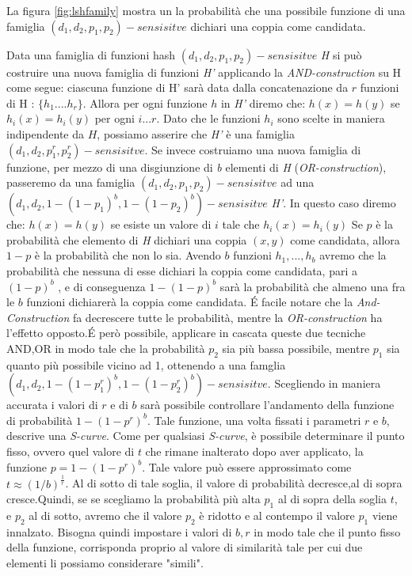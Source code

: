 \documentclass[a4paper,12pt]{report}
\begin{document}
La figura \ref{fig:lshfamily} mostra un la probabilità che una possibile funzione di una famiglia  $(d_1,d_2,p_1,p_2)-sensisitve$ dichiari una coppia come candidata.

Data una famiglia di funzioni hash $(d_1,d_2,p_1,p_2)-sensisitve$ \emph{H} si può costruire una nuova famiglia di funzioni \emph{H'} applicando la \emph{AND-construction} su H come segue: ciascuna funzione di H' sarà data dalla concatenazione  da $r$ funzioni di H : $\lbrace h_1....h_r \rbrace $. Allora per ogni funzione $h$ in \emph{H'} diremo che: $h(x)=h(y)$ se $h_i(x)=h_i(y)$ per ogni $i...r$.  Dato che le funzioni $h_i$ sono scelte in maniera indipendente da $H$, possiamo asserire che \emph{H'} è una famiglia $(d_1,d_2,p_1^r,p_2^r)-sensisitve$.
Se invece costruiamo una nuova famiglia di funzione, per mezzo di una disgiunzione di \emph{b} elementi  di \emph{H} (\emph{OR-construction}), passeremo da una famiglia  $(d_1,d_2,p_1,p_2)-sensisitve$ ad una  $(d_1,d_2,1-(1-p_1)^b,1-(1-p_2)^b)-sensisitve$ \emph{H'}. In questo caso diremo che: $h(x)=h(y)$ se esiste  un valore di $i$ tale che $h_i(x)=h_i(y)$ 
Se $p$ è la probabilità che elemento di \emph{H} dichiari una coppia $(x,y)$ come candidata, allora $1-p$ è la probabilità che non lo sia. Avendo $b$ funzioni $h_1,...,h_b$ avremo che la probabilità che nessuna di esse dichiari la coppia come candidata, pari a   $(1-p)^b$ , e di conseguenza $1-(1-p)^b$ sarà la probabilità che almeno una fra le $b$ funzioni dichiarerà la coppia come candidata.
\'E facile notare che la \emph{And-Construction} fa decrescere tutte le probabilità, mentre la \emph{OR-construction} ha l'effetto opposto.\'E però possibile, applicare in cascata queste due tecniche AND,OR in modo tale che la probabilità $p_2$ sia più bassa possibile, mentre $p_1$ sia quanto più possibile vicino ad 1, ottenendo a una famglia $(d_1,d_2,1-(1-p_1^r)^b,1-(1-p_2^r)^b)-sensisitve$. Scegliendo in maniera accurata i valori di $r$ e di $b$ sarà possibile controllare l'andamento della funzione di probabilità $1-(1-p^r)^b$.
Tale funzione, una volta fissati i parametri $r$ e $b$, descrive una \emph{S-curve}. Come per qualsiasi \emph{S-curve}, è possibile determinare il punto fisso, ovvero quel valore di $t$ che rimane inalterato dopo aver applicato, la funzione $p=1-(1-p^r)^b$. Tale valore può essere approssimato come $t\approx (1/b)^\frac{1}{r}$. Al di sotto di tale soglia, il valore di probabilità decresce,al di sopra cresce.Quindi, se  se scegliamo la probabilità più alta $p_1$ al di sopra della soglia $t$, e $p_2$ al di sotto, avremo che il valore  $p_2$ è ridotto e al contempo il valore $p_1$ viene innalzato. Bisogna quindi impostare i valori di $b,r$ in modo tale che il punto fisso della funzione, corrisponda proprio al valore di similarità tale per cui due elementi li possiamo considerare "simili".
\end{document}
